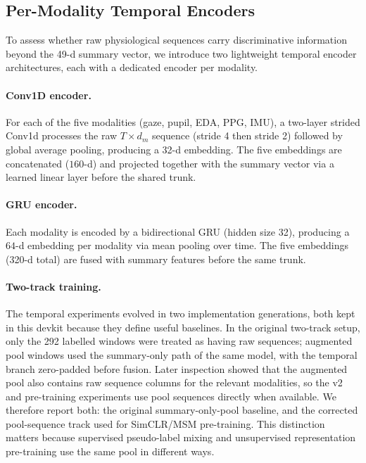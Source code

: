 \documentclass[sigconf,nonacm]{acmart}
\begin{document}
\subsection{Per-Modality Temporal Encoders}
\label{sec:temporal_encoders}

To assess whether raw physiological sequences carry discriminative information
beyond the 49-d summary vector, we introduce two lightweight temporal encoder
architectures, each with a dedicated encoder per modality.

\paragraph{Conv1D encoder.}
For each of the five modalities (gaze, pupil, EDA, PPG, IMU), a two-layer
strided Conv1d processes the raw $T{\times}d_m$ sequence
(stride 4 then stride 2) followed by global average pooling,
producing a 32-d embedding.
The five embeddings are concatenated ($160$-d) and projected together
with the summary vector via a learned linear layer before the shared trunk.

\paragraph{GRU encoder.}
Each modality is encoded by a bidirectional GRU (hidden size 32),
producing a $64$-d embedding per modality via mean pooling over time.
The five embeddings (320-d total) are fused with summary features
before the same trunk.

\paragraph{Two-track training.}
The temporal experiments evolved in two implementation generations, both kept
in this devkit because they define useful baselines.
In the original two-track setup, only the 292 labelled windows were treated as
having raw sequences; augmented pool windows used the summary-only path of the
same model, with the temporal branch zero-padded before fusion.
Later inspection showed that the augmented pool also contains raw sequence
columns for the relevant modalities, so the v2 and pre-training experiments
use pool sequences directly when available.
We therefore report both: the original summary-only-pool baseline, and the
corrected pool-sequence track used for SimCLR/MSM pre-training.
This distinction matters because supervised pseudo-label mixing and
unsupervised representation pre-training use the same pool in different ways.
\end{document}

